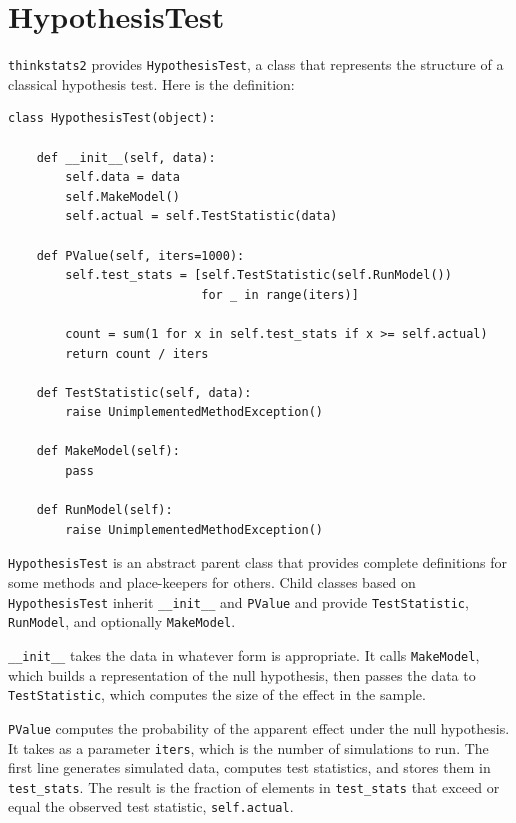 \documentclass[12pt]{book}
\begin{document}
\section{HypothesisTest}
\label{hypotest}

{\tt thinkstats2} provides {\tt HypothesisTest}, a
class that represents the structure of a classical hypothesis
test.  Here is the definition:

\begin{verbatim}
class HypothesisTest(object):

    def __init__(self, data):
        self.data = data
        self.MakeModel()
        self.actual = self.TestStatistic(data)

    def PValue(self, iters=1000):
        self.test_stats = [self.TestStatistic(self.RunModel()) 
                           for _ in range(iters)]

        count = sum(1 for x in self.test_stats if x >= self.actual)
        return count / iters

    def TestStatistic(self, data):
        raise UnimplementedMethodException()

    def MakeModel(self):
        pass

    def RunModel(self):
        raise UnimplementedMethodException()
\end{verbatim}

{\tt HypothesisTest} is an abstract parent class that provides
complete definitions for some methods and place-keepers for others.
Child classes based on {\tt HypothesisTest} inherit \verb"__init__"
and {\tt PValue} and provide {\tt TestStatistic},
{\tt RunModel}, and optionally {\tt MakeModel}.

\verb"__init__" takes the data in whatever form is appropriate.  It
calls {\tt MakeModel}, which builds a representation of the null
hypothesis, then passes the data to {\tt TestStatistic}, which
computes the size of the effect in the sample.

{\tt PValue} computes the probability of the apparent effect under
the null hypothesis.  It takes as a parameter {\tt iters}, which is
the number of simulations to run.  The first line generates simulated
data, computes test statistics, and stores them in
\verb"test_stats".
The result is
the fraction of elements in \verb"test_stats" that
exceed or equal the observed test statistic, {\tt self.actual}.
\end{document}
